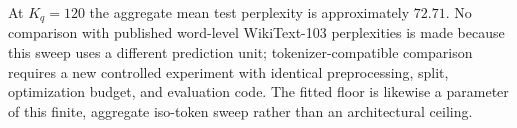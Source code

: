 At $K_q=120$ the aggregate mean test perplexity is approximately $72.71$. No comparison with published word-level WikiText-103 perplexities is made because this sweep uses a different prediction unit; tokenizer-compatible comparison requires a new controlled experiment with identical preprocessing, split, optimization budget, and evaluation code. The fitted floor is likewise a parameter of this finite, aggregate iso-token sweep rather than an architectural ceiling.

